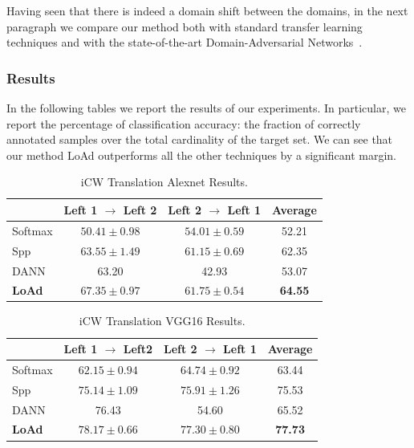 \documentclass[../main.tex]{subfiles}
\begin{document}
	Having seen that there is indeed a domain shift between the domains, in the next paragraph we compare our method both with
	standard transfer learning techniques and with the state-of-the-art Domain-Adversarial Networks~\cite{DANN}.

    \subsubsection{Results}\label{subsubsec:results}
	In the following tables we report the results of our experiments. In particular, we report the percentage of classification accuracy:
    the fraction of correctly annotated samples over the total cardinality of the target set.
    We can see that our method LoAd outperforms
	all the other techniques by a significant margin.
    \newline

    \begin{table}[!ht]
        \centering{}
        \begin{tabular}{l c c c}
            \toprule
                     & Left 1 $\rightarrow$ Left 2 & Left 2 $\rightarrow$ Left 1 & Average \\
            \midrule
            Softmax  & $50.41 \pm{} 0.98$ & $54.01 \pm{} 0.59$ & 52.21 \\
            Spp      & $63.55 \pm{} 1.49$ & $61.15 \pm{} 0.69$ & 62.35 \\
            DANN     &  63.20             &  42.93             & 53.07 \\
        \textbf{LoAd} & $\mathbf{67.35 \pm{} 0.97}$ & $\mathbf{61.75 \pm{} 0.54}$ & \textbf{64.55} \\
            \bottomrule
        \end{tabular}
        \caption{iCW Translation Alexnet Results.}
    \end{table}

    \begin{table}[!ht]
        \centering{}
        \begin{tabular}{l c c c}
            \toprule
                     & Left 1 $\rightarrow$ Left2 & Left 2 $\rightarrow$ Left 1 & Average \\
            \midrule
            Softmax  & $62.15 \pm{} 0.94$ & $64.74 \pm{} 0.92$ & 63.44 \\
            Spp      & $75.14 \pm{} 1.09$ & $75.91 \pm{} 1.26$ & 75.53 \\
            DANN     &  76.43             &  54.60             & 65.52 \\
        \textbf{LoAd} & $\mathbf{78.17 \pm{} 0.66}$ & $\mathbf{77.30 \pm{} 0.80}$ & \textbf{77.73} \\
            \bottomrule
        \end{tabular}
        \caption{iCW Translation VGG16 Results.}
    \end{table}
\end{document}
